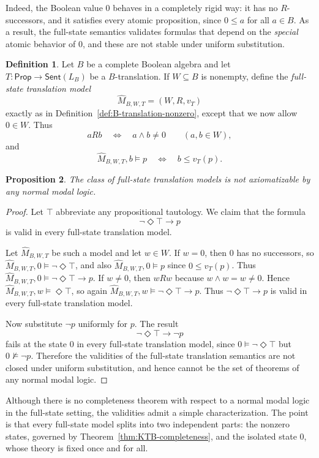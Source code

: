 \documentclass[11pt]{amsart}
\theoremstyle{definition}
\newtheorem{definition}{Definition}[section]
\theoremstyle{plain}
\newtheorem{proposition}[definition]{Proposition}
\newcommand{\Prop}{\mathsf{Prop}}
\newcommand{\Sent}{\mathsf{Sent}}
\begin{document}
Indeed, the Boolean value $0$ behaves in a completely rigid way:
it has no $R$-successors, and it satisfies every atomic proposition, since $0\leq a$ for all
$a\in B$. As a result, the full-state semantics validates formulas that depend on the \emph{special}
atomic behavior of $0$, and these are not stable under uniform substitution.

\begin{definition}\label{def:full-translation-model}
Let $B$ be a complete Boolean algebra and let $T:\Prop\to\Sent(L_B)$ be a $B$-translation.
If $W\subseteq B$ is nonempty, define the \emph{full-state translation model}
\[
\widehat M_{B,W,T}=(W,R,v_T)
\]
exactly as in Definition~\ref{def:B-translation-nonzero}, except that we now allow $0\in W$.
Thus
\[
aRb \quad\Longleftrightarrow\quad a\wedge b\neq 0 \qquad (a,b\in W),
\]
and
\[
\widehat M_{B,W,T},b\models p \quad\Longleftrightarrow\quad b\leq v_T(p).
\]
\end{definition}

\begin{proposition}\label{prop:full-state-not-normal}
The class of full-state translation models is not axiomatizable by any normal modal logic.
\end{proposition}

\begin{proof}
Let $\top$ abbreviate any propositional tautology. We claim that the formula
\[
\neg\Diamond\top \to p
\]
is valid in every full-state translation model.

Let $\widehat M_{B,W,T}$ be such a model and let $w\in W$.
If $w=0$, then $0$ has no successors, so $\widehat M_{B,W,T},0\models \neg\Diamond\top$,
and also $\widehat M_{B,W,T},0\models p$ since $0\leq v_T(p)$.
Thus $\widehat M_{B,W,T},0\models \neg\Diamond\top\to p$.
If $w\neq 0$, then $wRw$ because $w\wedge w=w\neq 0$. Hence
$\widehat M_{B,W,T},w\models \Diamond\top$, so again
$\widehat M_{B,W,T},w\models \neg\Diamond\top\to p$.
Thus $\neg\Diamond\top\to p$ is valid in every full-state translation model.

Now substitute $\neg p$ uniformly for $p$. The result
\[
\neg\Diamond\top \to \neg p
\]
fails at the state $0$ in every full-state translation model, since
$0\models \neg\Diamond\top$ but $0\not\models \neg p$.
Therefore the validities of the full-state translation semantics are not closed under uniform
substitution, and hence cannot be the set of theorems of any normal modal logic.
\end{proof}

Although there is no completeness theorem with respect to a normal modal logic in the full-state
setting, the validities admit a simple characterization. The point is that every full-state model
splits into two independent parts: the nonzero states, governed by Theorem~\ref{thm:KTB-completeness},
and the isolated state $0$, whose theory is fixed once and for all.
\end{document}
